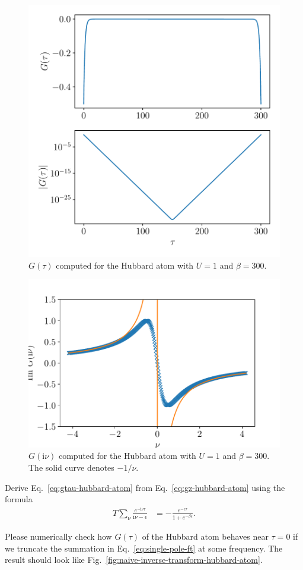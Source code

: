 \documentclass[submission, LectureNotes]{SciPost}
\newcommand\ii{\mathrm{i}}%
\newcommand\iv{\ii\nu}%
\begin{document}
\begin{figure}
    \centering
    \includegraphics[width=0.5\columnwidth]{gtau_hubbard_atom.pdf}
    \caption{$G(\tau)$ computed for the Hubbard atom with $U=1$ and $\beta=300$.}
    \label{fig:gtau-hubbard-atom}
\end{figure}
\begin{figure}
    \centering
    \includegraphics[width=0.5\columnwidth]{giv_hubbard_atom.pdf}
    \caption{$G(\iv)$ computed for the Hubbard atom with $U=1$ and $\beta=300$. The solid curve denotes $-1/\nu$.}
    \label{fig:giv-hubbard-atom}
\end{figure}

\begin{Exercise}
Derive Eq.~\eqref{eq:gtau-hubbard-atom} from Eq.~\eqref{eq:gz-hubbard-atom} using 
the formula
\begin{align}
   T\sum_{\nu} \frac{e^{-\iv\tau}}{\iv - \epsilon} &= - \frac{e^{-\epsilon\tau}}{1+e^{-\beta\epsilon}}.\label{eq:single-pole-ft}
\end{align}
\end{Exercise}

\begin{Exercise}[label=ex:native-inverse-transform]
Please numerically check how $G(\tau)$ of the Hubbard atom behaves near $\tau=0$ if we truncate the summation in Eq.~\eqref{eq:single-pole-ft} at some frequency.
The result should look like Fig.~\ref{fig:naive-inverse-transform-hubbard-atom}.
\end{Exercise}
\end{document}
